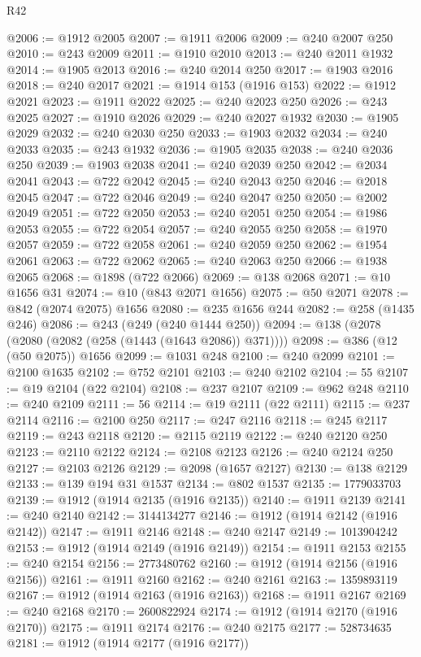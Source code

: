 \begin{lexlean}{R42}
\begin{coremodule}
{@2006 := @1912 @2005
@2007 := @1911 @2006
@2009 := @240 @2007 @250
@2010 := @243 @2009
@2011 := @1910 @2010
@2013 := @240 @2011 @1932
@2014 := @1905 @2013
@2016 := @240 @2014 @250
@2017 := @1903 @2016
@2018 := @240 @2017
@2021 := @1914 @153 (@1916 @153)
@2022 := @1912 @2021
@2023 := @1911 @2022
@2025 := @240 @2023 @250
@2026 := @243 @2025
@2027 := @1910 @2026
@2029 := @240 @2027 @1932
@2030 := @1905 @2029
@2032 := @240 @2030 @250
@2033 := @1903 @2032
@2034 := @240 @2033
@2035 := @243 @1932
@2036 := @1905 @2035
@2038 := @240 @2036 @250
@2039 := @1903 @2038
@2041 := @240 @2039 @250
@2042 := @2034 @2041
@2043 := @722 @2042
@2045 := @240 @2043 @250
@2046 := @2018 @2045
@2047 := @722 @2046
@2049 := @240 @2047 @250
@2050 := @2002 @2049
@2051 := @722 @2050
@2053 := @240 @2051 @250
@2054 := @1986 @2053
@2055 := @722 @2054
@2057 := @240 @2055 @250
@2058 := @1970 @2057
@2059 := @722 @2058
@2061 := @240 @2059 @250
@2062 := @1954 @2061
@2063 := @722 @2062
@2065 := @240 @2063 @250
@2066 := @1938 @2065
@2068 := @1898 (@722 @2066)
@2069 := @138 @2068
@2071 := @10 @1656 @31
@2074 := @10 (@843 @2071 @1656)
@2075 := @50 @2071
@2078 := @842 (@2074 @2075) @1656
@2080 := @235 @1656 @244
@2082 := @258 (@1435 @246)
@2086 := @243 (@249 (@240 @1444 @250))
@2094 := @138 (@2078 (@2080 (@2082 (@258 (@1443 (@1643 @2086)) @371))))
@2098 := @386 (@12 (@50 @2075)) @1656
@2099 := @1031 @248
@2100 := @240 @2099
@2101 := @2100 @1635
@2102 := @752 @2101
@2103 := @240 @2102
@2104 := 55
@2107 := @19 @2104 (@22 @2104)
@2108 := @237 @2107
@2109 := @962 @248
@2110 := @240 @2109
@2111 := 56
@2114 := @19 @2111 (@22 @2111)
@2115 := @237 @2114
@2116 := @2100 @250
@2117 := @247 @2116
@2118 := @245 @2117
@2119 := @243 @2118
@2120 := @2115 @2119
@2122 := @240 @2120 @250
@2123 := @2110 @2122
@2124 := @2108 @2123
@2126 := @240 @2124 @250
@2127 := @2103 @2126
@2129 := @2098 (@1657 @2127)
@2130 := @138 @2129
@2133 := @139 @194 @31 @1537
@2134 := @802 @1537
@2135 := 1779033703
@2139 := @1912 (@1914 @2135 (@1916 @2135))
@2140 := @1911 @2139
@2141 := @240 @2140
@2142 := 3144134277
@2146 := @1912 (@1914 @2142 (@1916 @2142))
@2147 := @1911 @2146
@2148 := @240 @2147
@2149 := 1013904242
@2153 := @1912 (@1914 @2149 (@1916 @2149))
@2154 := @1911 @2153
@2155 := @240 @2154
@2156 := 2773480762
@2160 := @1912 (@1914 @2156 (@1916 @2156))
@2161 := @1911 @2160
@2162 := @240 @2161
@2163 := 1359893119
@2167 := @1912 (@1914 @2163 (@1916 @2163))
@2168 := @1911 @2167
@2169 := @240 @2168
@2170 := 2600822924
@2174 := @1912 (@1914 @2170 (@1916 @2170))
@2175 := @1911 @2174
@2176 := @240 @2175
@2177 := 528734635
@2181 := @1912 (@1914 @2177 (@1916 @2177))
}
\end{coremodule}
\end{lexlean}
